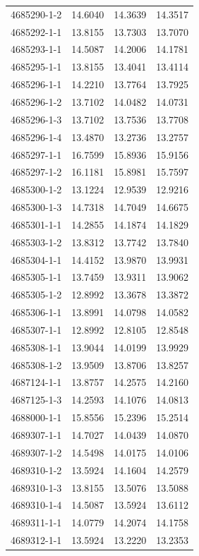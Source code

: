 \begin{longtable}{lrrr}
4685290-1-2 & 14.6040 & 14.3639 & 14.3517 \\
4685292-1-1 & 13.8155 & 13.7303 & 13.7070 \\
4685293-1-1 & 14.5087 & 14.2006 & 14.1781 \\
4685295-1-1 & 13.8155 & 13.4041 & 13.4114 \\
4685296-1-1 & 14.2210 & 13.7764 & 13.7925 \\
4685296-1-2 & 13.7102 & 14.0482 & 14.0731 \\
4685296-1-3 & 13.7102 & 13.7536 & 13.7708 \\
4685296-1-4 & 13.4870 & 13.2736 & 13.2757 \\
4685297-1-1 & 16.7599 & 15.8936 & 15.9156 \\
4685297-1-2 & 16.1181 & 15.8981 & 15.7597 \\
4685300-1-2 & 13.1224 & 12.9539 & 12.9216 \\
4685300-1-3 & 14.7318 & 14.7049 & 14.6675 \\
4685301-1-1 & 14.2855 & 14.1874 & 14.1829 \\
4685303-1-2 & 13.8312 & 13.7742 & 13.7840 \\
4685304-1-1 & 14.4152 & 13.9870 & 13.9931 \\
4685305-1-1 & 13.7459 & 13.9311 & 13.9062 \\
4685305-1-2 & 12.8992 & 13.3678 & 13.3872 \\
4685306-1-1 & 13.8991 & 14.0798 & 14.0582 \\
4685307-1-1 & 12.8992 & 12.8105 & 12.8548 \\
4685308-1-1 & 13.9044 & 14.0199 & 13.9929 \\
4685308-1-2 & 13.9509 & 13.8706 & 13.8257 \\
4687124-1-1 & 13.8757 & 14.2575 & 14.2160 \\
4687125-1-3 & 14.2593 & 14.1076 & 14.0813 \\
4688000-1-1 & 15.8556 & 15.2396 & 15.2514 \\
4689307-1-1 & 14.7027 & 14.0439 & 14.0870 \\
4689307-1-2 & 14.5498 & 14.0175 & 14.0106 \\
4689310-1-2 & 13.5924 & 14.1604 & 14.2579 \\
4689310-1-3 & 13.8155 & 13.5076 & 13.5088 \\
4689310-1-4 & 14.5087 & 13.5924 & 13.6112 \\
4689311-1-1 & 14.0779 & 14.2074 & 14.1758 \\
4689312-1-1 & 13.5924 & 13.2220 & 13.2353 \\

\end{longtable}
